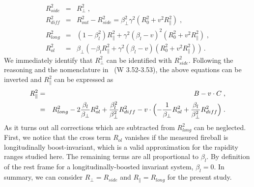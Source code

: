 \documentclass[a4paper,11pt]{scrartcl}
\begin{document}
\begin{appendix}
\begin{eqnarray}
R_{side}^{2}    &=& R_{\perp}^{2}  \;, \\
R_{diff}^{2} &=& R_{out}^{2} -  R_{side}^{2} = \beta_{\perp}^2 \gamma^2 (R_{0}^2 + v^2R_{\parallel}^2) \;, \\
R_{long}^{2}     &=& (1 - \beta_l^2) R_{\parallel}^2 + \gamma^2 (\beta_l - v)^2 (R_{0}^2 + v^2R_{\parallel}^2) \;, \\
R_{ol}^{2}   &=& \beta_{\perp} (-\beta_l R_{\parallel}^{2} +  \gamma^2 (\beta_l - v)(R_{0}^2 + v^2R_{\parallel}^2)) \,.
\end{eqnarray}
%
We immediately identify that $R_{\perp}^2$ can be identified with $R_{side}^{2}$. Following the reasoning and the nomenclature in~\cite{Wiedemann:1999qn} (W 3.52-3.53), the above equations can be inverted and $R_{\parallel}^{2}$ can be expressed as 
%
\begin{eqnarray}
R_{\parallel}^{2} &=& B  - v \cdot C \;, \\
                          &=& R_{long}^2 - 2{\beta_l \over \beta_\perp}  R_{ol}^2 + {\beta_l^2 \over \beta_\perp^2} R_{diff}^2 
                          - v \cdot \Bigl(-{1 \over \beta_\perp } R_{ol}^2 + {\beta_l \over \beta_\perp^2} R_{diff}^2  \Bigr) \; .
\end{eqnarray}
%
As it turns out all corrections which are subtracted from $R_{long}^{2}$ can be neglected. First, we notice that the cross term $R_{ol}$ vanishes if the measured fireball is longitudinally boost-invariant, which is a valid approximation for the rapidity ranges studied here. The remaining terms are all proportional to $\beta_l$. By definition of the rest frame for a longitudinally-boosted invariant system, $\beta_l = 0$. In summary, we can consider $R_{\perp} = R_{side}$ and $R_{\parallel}=R_{long}$ for the present study.


\end{appendix}

 	

\end{document}
